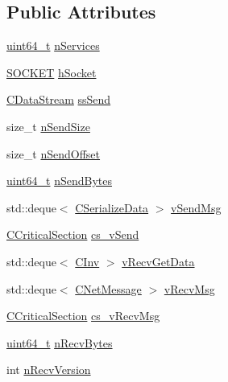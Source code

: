 \subsection*{Public Attributes}
\begin{DoxyCompactItemize}
\item 
\hyperlink{stdint_8h_aaa5d1cd013383c889537491c3cfd9aad}{uint64\+\_\+t} \hyperlink{class_c_node_a8259db81211f6837585c6f82f89414ff}{n\+Services}
\item 
\hyperlink{compat_8h_a26ef1173e2f2c0d3db27eca28397d723}{S\+O\+C\+K\+E\+T} \hyperlink{class_c_node_a7cda6efa6a9ef9db3eebe70fc3bdd45a}{h\+Socket}
\item 
\hyperlink{class_c_data_stream}{C\+Data\+Stream} \hyperlink{class_c_node_a6174b5a3d8d8f6a2daf02be3cf04dc63}{ss\+Send}
\item 
size\+\_\+t \hyperlink{class_c_node_a3c99b7e2b0e53feb58f6859453456f74}{n\+Send\+Size}
\item 
size\+\_\+t \hyperlink{class_c_node_a090bda86de6b84c3db83e1f029d4f453}{n\+Send\+Offset}
\item 
\hyperlink{stdint_8h_aaa5d1cd013383c889537491c3cfd9aad}{uint64\+\_\+t} \hyperlink{class_c_node_a33e24a9544df3c60f9e1ec05b5e91051}{n\+Send\+Bytes}
\item 
std\+::deque$<$ \hyperlink{serialize_8h_a77935f92ff5ba1d71d692166f6ce0c1b}{C\+Serialize\+Data} $>$ \hyperlink{class_c_node_a68e5fb1a80fe4247aa577a3c9a74b399}{v\+Send\+Msg}
\item 
\hyperlink{sync_8h_a37a4692b2d517f2843655ca11af7668a}{C\+Critical\+Section} \hyperlink{class_c_node_a79edcac83fc5067567c7b41c26fcc56f}{cs\+\_\+v\+Send}
\item 
std\+::deque$<$ \hyperlink{class_c_inv}{C\+Inv} $>$ \hyperlink{class_c_node_a9649c1f27ff0d8f0ba89eb1ea5bee139}{v\+Recv\+Get\+Data}
\item 
std\+::deque$<$ \hyperlink{class_c_net_message}{C\+Net\+Message} $>$ \hyperlink{class_c_node_a015361812daa5b6ebb9a5692ddf67a54}{v\+Recv\+Msg}
\item 
\hyperlink{sync_8h_a37a4692b2d517f2843655ca11af7668a}{C\+Critical\+Section} \hyperlink{class_c_node_abaebfaf8fff7e2e99366ae2bc69af6cd}{cs\+\_\+v\+Recv\+Msg}
\item 
\hyperlink{stdint_8h_aaa5d1cd013383c889537491c3cfd9aad}{uint64\+\_\+t} \hyperlink{class_c_node_a8bbe2a7052476d62acf7f0a5a9c5981b}{n\+Recv\+Bytes}
\item 
int \hyperlink{class_c_node_ab7494353448b922accfb645bd26ac271}{n\+Recv\+Version}
\item 

\end{DoxyCompactItemize}
